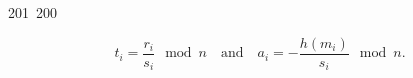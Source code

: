201~200~\documentclass{article}
\begin{document}
	                                                                        	                                                                    	                                	                    	                    	                        	                        	                    	                                                                	                	                                                                    	                    					\[
	                                                                        	                                                                    	                                	                    	                    	                        	                        	                    	                                                                	                	                                                                    	                    						t_i = \frac{r_i}{s_i} \mod n \quad \text{and} \quad a_i = -\frac{h(m_i)}{s_i} \mod n.
	                                                                        	                                                                    	                                	                    	                    	                        	                        	                    	                                                                	                	                                                                    	                    						\]
\end{document}
